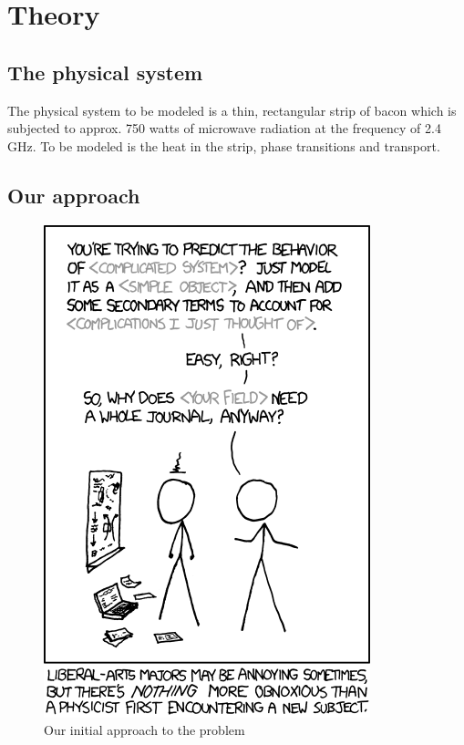 \chapter{Theory}
\section{The physical system}
The physical system to be modeled is a thin, rectangular strip of bacon which is
subjected to approx. 750 watts of microwave radiation at the frequency of 2.4
GHz. To be modeled is the heat in the strip, phase transitions and transport.

\section{Our approach}
\begin{figure}[!h]
  \begin{center}
    \includegraphics[width=0.8\linewidth]{physicists.png}
  \end{center}
  \caption{Our initial approach to the problem}
  \label{fig:xkcd_physics}
\end{figure}

